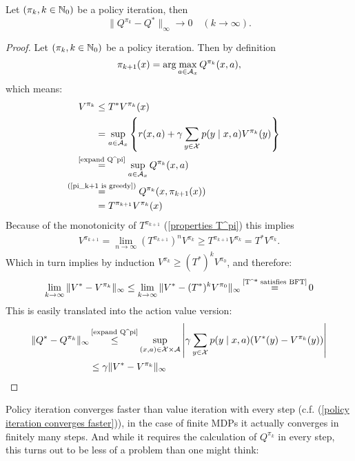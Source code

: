 \begin{prop}
	Let \((\pi_k,k\in\mathbb{N}_0)\) be a policy iteration, then
	\[\|Q^{\pi_k}-Q^*\|_\infty \to 0 \quad (k\to\infty). \] 
\end{prop}
\begin{proof}
	Let \((\pi_k,k\in\mathbb{N}_0)\) be a policy iteration. Then by definition
	\begin{align}\label{pi_k+1 is greedy}
		\pi_{k+1}(x)=\arg\max_{a\in\mathcal{A}_x} Q^{\pi_k}(x,a),
	\end{align}
	which means:
	\begin{align}
		V^{\pi_k} &\le T^* V^{\pi_k}(x)
		\label{real improvement or optimal}\\
		&=\sup_{a\in\cA_x}\left\{r(x,a)+\gamma \sum_{y\in\cX}p(y\mid x,a)V^{\pi_k}(y) \right\}
		\nonumber\\
		&\lxeq{\text{\ref{expand Q^pi}}}\sup_{a\in\cA_x}Q^{\pi_k}(x,a)
		\nonumber\\
		&\lxeq{\text{(\ref{pi_k+1 is greedy})} }Q^{\pi_k}(x,\pi_{k+1}(x))
		\nonumber\\
		&=T^{\pi_{k+1}}V^{\pi_k}(x)
		\nonumber
	\end{align}
	Because of the monotonicity of \(T^{\pi_{k+1}}\) (\ref{properties T^pi}) this implies
	\begin{align}\label{policy iteration converges faster}
		V^{\pi_{k+1}}=\lim_{n\to\infty}(T^{\pi_{k+1}})^n V^{\pi_k}
		\ge T^{\pi_{k+1}} V^{\pi_k} 
		= T^* V^{\pi_k}.
	\end{align}
	Which in turn implies by induction \(V^{\pi_{k}} \ge (T^*)^k V^{\pi_0}\), and therefore:
	\begin{align*}
		\lim_{k\to\infty} \|V^* - V^{\pi_k}\|_\infty 
		\le \lim_{k\to\infty} \|V^* - (T^*)^k V^{\pi_0}\|_\infty 
		\xeq{\text{\ref{T^* satisfies BFT}}} 0
	\end{align*}
	This is easily translated into the action value version:
	\begin{align*}
		\|Q^* - Q^{\pi_k}\|_\infty &\xlq{\text{\ref{expand Q^pi}}} \sup_{(x,a)\in\cX\times\cA} \left| 
			\gamma \sum_{y\in\cX}p(y\mid x,a) (V^*(y)- V^{\pi_k}(y))
		\right|\\
		&\le \gamma \| V^* -V^{\pi_k}\|_\infty \qedhere
	\end{align*}
\end{proof}  

Policy iteration converges faster than value iteration with every step 
(c.f. (\ref{policy iteration converges faster})), in the case of finite MDPs it actually converges in finitely many steps. And while it requires the calculation of \(Q^{\pi_k}\) in every step, this turns out to be less of a problem than one might think:

